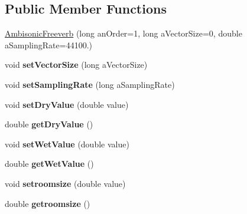\subsection*{Public Member Functions}
\begin{DoxyCompactItemize}
\item 
\hyperlink{class_ambisonic_freeverb_a802c9cbbd9eb3a1d8dbf70205f26807f}{Ambisonic\-Freeverb} (long an\-Order=1, long a\-Vector\-Size=0, double a\-Sampling\-Rate=44100.)
\item 
\hypertarget{class_ambisonic_freeverb_aa242daed003879c71050d63cc4188195}{void {\bfseries set\-Vector\-Size} (long a\-Vector\-Size)}\label{class_ambisonic_freeverb_aa242daed003879c71050d63cc4188195}

\item 
\hypertarget{class_ambisonic_freeverb_a62301fda369160aa580f6273db539055}{void {\bfseries set\-Sampling\-Rate} (long a\-Sampling\-Rate)}\label{class_ambisonic_freeverb_a62301fda369160aa580f6273db539055}

\item 
\hypertarget{class_ambisonic_freeverb_a065b4ef4d872581db86785c4bcc3dcc2}{void {\bfseries set\-Dry\-Value} (double value)}\label{class_ambisonic_freeverb_a065b4ef4d872581db86785c4bcc3dcc2}

\item 
\hypertarget{class_ambisonic_freeverb_a9da2b23831a4481687a8dc75340ccd98}{double {\bfseries get\-Dry\-Value} ()}\label{class_ambisonic_freeverb_a9da2b23831a4481687a8dc75340ccd98}

\item 
\hypertarget{class_ambisonic_freeverb_aeeb92561e55803464be84d97fe689e89}{void {\bfseries set\-Wet\-Value} (double value)}\label{class_ambisonic_freeverb_aeeb92561e55803464be84d97fe689e89}

\item 
\hypertarget{class_ambisonic_freeverb_ada5d7c30656ec0dc98f29b904cf977f8}{double {\bfseries get\-Wet\-Value} ()}\label{class_ambisonic_freeverb_ada5d7c30656ec0dc98f29b904cf977f8}

\item 
\hypertarget{class_ambisonic_freeverb_a5b2485989bf1849e3bbad0d1cb9af6f8}{void {\bfseries setroomsize} (double value)}\label{class_ambisonic_freeverb_a5b2485989bf1849e3bbad0d1cb9af6f8}

\item 
\hypertarget{class_ambisonic_freeverb_aaadead293d132f753b7367fc84d7c8bc}{double {\bfseries getroomsize} ()}\label{class_ambisonic_freeverb_aaadead293d132f753b7367fc84d7c8bc}


\end{DoxyCompactItemize}
